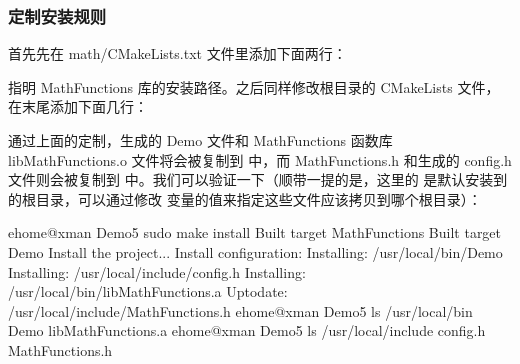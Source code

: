 \documentclass[a4paper,12pt,english]{sphinxmanual}
\begin{document}
\subsubsection{定制安装规则}
\label{\detokenize{dev-board/cmake:id9}}
\sphinxAtStartPar
首先先在 math/CMakeLists.txt 文件里添加下面两行：

\begin{sphinxVerbatim}[commandchars=\\\{\}]
 
 
\end{sphinxVerbatim}

\sphinxAtStartPar
指明 MathFunctions 库的安装路径。之后同样修改根目录的 CMakeLists 文件，在末尾添加下面几行：

\begin{sphinxVerbatim}[commandchars=\\\{\}]
 
 
\end{sphinxVerbatim}

\sphinxAtStartPar
通过上面的定制，生成的 Demo 文件和 MathFunctions 函数库 libMathFunctions.o 文件将会被复制到  中，而 MathFunctions.h 和生成的 config.h 文件则会被复制到  中。我们可以验证一下（顺带一提的是，这里的  是默认安装到的根目录，可以通过修改  变量的值来指定这些文件应该拷贝到哪个根目录）：

\begin{sphinxVerbatim}[commandchars=\\\{\}]
\PYG{o}{[}ehome@xman Demo5\PYG{o}{]}\PYGZdl{} sudo make install
\PYG{o}{[} \PYGZpc{}\PYG{o}{]} Built target MathFunctions
\PYG{o}{[}\PYGZpc{}\PYG{o}{]} Built target Demo
Install the project...
\PYGZhy{}\PYGZhy{} Install configuration: 
\PYGZhy{}\PYGZhy{} Installing: /usr/local/bin/Demo
\PYGZhy{}\PYGZhy{} Installing: /usr/local/include/config.h
\PYGZhy{}\PYGZhy{} Installing: /usr/local/bin/libMathFunctions.a
\PYGZhy{}\PYGZhy{} Up\PYGZhy{}to\PYGZhy{}date: /usr/local/include/MathFunctions.h
\PYG{o}{[}ehome@xman Demo5\PYG{o}{]}\PYGZdl{} ls /usr/local/bin
Demo  libMathFunctions.a
\PYG{o}{[}ehome@xman Demo5\PYG{o}{]}\PYGZdl{} ls /usr/local/include
config.h  MathFunctions.h
\end{sphinxVerbatim}
\end{document}
